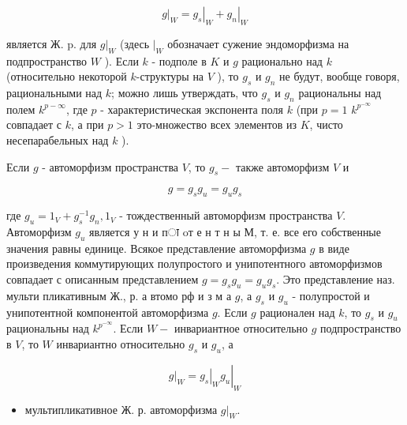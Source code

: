 \documentclass[10pt]{article}
\begin{document}
\[

\left.g\right|_{W}=\left.g_{s}\right|_{W}+\left.g_{n}\right|_{W}

\]



является Ж. p. для $\left.g\right|_{W}$ (здесь $\left.\right|_{W}$ обозначает сужение эндоморфизма на подпространство $W$ ). Если $k$ - подполе в $K$ и $g$ рационально над $k$ (относительно некоторой $k$-структуры на $V$ ), то $g_{s}$ и $g_{n}$ не будут, вообще говоря, рациональными над $k$; можно лишь утверждать, что $g_{s}$ и $g_{n}$ рациональны над полем $k^{p-\infty}$, где $p$ - характеристическая экспонента поля $k$ (при $p=1$ $k^{p^{-\infty}}$ совпадает с $k$, а при $p>1$ это-множество всех элементов из $K$, чисто несепарабельных над $k$ ).



Если $g$ - автоморфизм пространства $V$, то $g_{s}-$ также автоморфизм $V$ и



\[

g=g_{s} g_{u}=g_{u} g_{s}

\]



где $g_{u}=1_{V}+g_{s}^{-1} g_{n}, 1_{V}$ - тождественный автоморфизм пространства $V$. Автоморфизм $g_{u}$ является у н и пा oт е н т н ы М, т. е. все его собственные значения равны единице. Всякое представление автоморфизма $g$ в виде произведения коммутирующих полупростого и унипотентного автоморфизмов совпадает с описанным представлением $g=g_{s} g_{u}=g_{u} g_{s}$. Это представление наз. мульти пликативным Ж., р. а втомо рф и з м а $g$, а $g_{s}$ и $g_{u}$ - полупростой и унипотентной компонентой автоморфизма $g$. Если $g$ рационален над $k$, то $g_{s}$ и $g_{u}$ рациональны над $k^{p^{-\infty}}$. Если $W-$ инвариантное относительно $g$ подпространство в $V$, то $W$ инвариантно относительно $g_{s}$ и $g_{u}$, а



\[

\left.g\right|_{W}=\left.\left.g_{s}\right|_{W} g_{u}\right|_{W}

\]



\begin{itemize}

  \item мультипликативное Ж. р. автоморфизма $\left.g\right|_{W}$.

\end{itemize}
\end{document}
